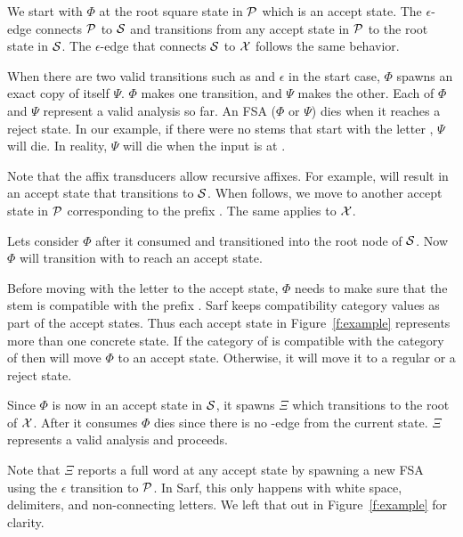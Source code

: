 \documentclass[11pt]{article}
\newcommand{\noTrRL}[1]{\transfalse\RL{#1}\transtrue}
\begin{document}
We start with $\Phi$ at the root square state in 
${\cal P}$ which is an accept state. 
The $\epsilon$-edge connects ${\cal P}$
to ${\cal S}$ and transitions from any accept state
in ${\cal P}$ to the root state in ${\cal S}$.
The $\epsilon$-edge that connects ${\cal S}$ to ${\cal X}$
follows the same behavior. 

When there are two valid transitions such as  
and $\epsilon$ in the start case, 
$\Phi$ spawns an exact copy of itself $\Psi$. 
$\Phi$ makes one transition, and $\Psi$ makes the other. 
Each of $\Phi$ and $\Psi$ represent a valid analysis so far. 
An FSA ($\Phi$ or $\Psi$) dies when it reaches a reject state.
In our example, if there were no stems that start 
with the letter , $\Psi$ will die. 
In reality, $\Psi$ will die when the input 
is at . 

Note that the affix transducers allow recursive 
affixes. 
For example,  will result in an accept state
that transitions to ${\cal S}$.
When  follows, we move to another accept state in 
${\cal P}$ corresponding to the prefix . 
The same applies to ${\cal X}$. 

Lets consider $\Phi$ after it consumed  
and transitioned into the root node of ${\cal S}$.
Now $\Phi$ will transition with  to reach an accept 
state. 

Before moving with the letter  to the accept state,
$\Phi$ needs to make sure that the stem  is compatible
with the prefix . 
Sarf keeps compatibility category values as part
of the accept states. 
Thus each accept state in Figure~\ref{f:example} represents
more than one concrete state. 
If the category of  is compatible with the category of
 then  will move $\Phi$ to an accept state. 
Otherwise, it will move it to a regular or a reject state. 
       
Since $\Phi$ is now in an accept state in ${\cal S}$, it 
spawns $\Xi$ which transitions to the root of ${\cal X}$. 
After it consumes  $\Phi$ dies since there is no
\noTrRL{h--}-edge from the current state.
$\Xi$ represents a valid analysis and proceeds.
       
Note that $\Xi$ reports a full word at any accept state
by spawning a new FSA using the $\epsilon$ transition
to ${\cal P}$.
In Sarf, this only happens with white space, delimiters, 
and non-connecting letters. 
We left that out in Figure~\ref{f:example} for clarity. 
       
\end{document}
